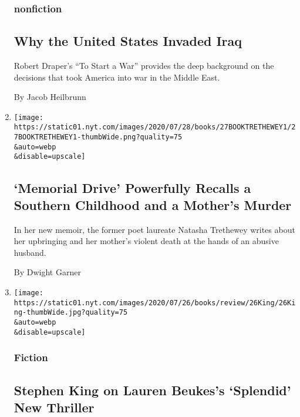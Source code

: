 \begin{enumerate}
  \hypertarget{nonfiction-1}{%
  \subsubsection{nonfiction}\label{nonfiction-1}}

  \hypertarget{why-the-united-states-invaded-iraq-1}{%
  \subsection{Why the United States Invaded
  Iraq}\label{why-the-united-states-invaded-iraq-1}}

  Robert Draper's ``To Start a War'' provides the deep background on the
  decisions that took America into war in the Middle East.

  By Jacob Heilbrunn
\item
  \href{/2020/07/27/books/review-memorial-drive-memoir-natasha-trethewey.html}{}

  \texttt{[image: https://static01.nyt.com/images/2020/07/28/books/27BOOKTRETHEWEY1/27BOOKTRETHEWEY1-thumbWide.png?quality=75\\\&auto=webp\\\&disable=upscale]}

  \hypertarget{memorial-drive-powerfully-recalls-a-southern-childhood-and-a-mothers-murder-1}{%
  \subsection{`Memorial Drive' Powerfully Recalls a Southern Childhood
  and a Mother's
  Murder}\label{memorial-drive-powerfully-recalls-a-southern-childhood-and-a-mothers-murder-1}}

  In her new memoir, the former poet laureate Natasha Trethewey writes
  about her upbringing and her mother's violent death at the hands of an
  abusive husband.

  By Dwight Garner
\item
  \href{/2020/07/24/books/review/lauren-beukes-afterland.html}{}

  \texttt{[image: https://static01.nyt.com/images/2020/07/26/books/review/26King/26King-thumbWide.jpg?quality=75\\\&auto=webp\\\&disable=upscale]}

  \hypertarget{fiction-1}{%
  \subsubsection{Fiction}\label{fiction-1}}

  \hypertarget{stephen-king-on-lauren-beukess-splendid-new-thriller-1}{%
  \subsection{Stephen King on Lauren Beukes's `Splendid' New
  Thriller}\label{stephen-king-on-lauren-beukess-splendid-new-thriller-1}}


\end{enumerate}
